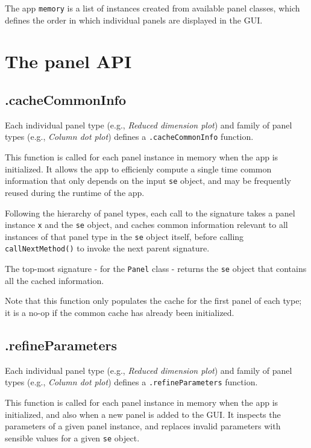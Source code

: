 \documentclass[]{book}
\begin{document}
The app \texttt{memory} is a list of instances created from available panel classes, which defines the order in which individual panels are displayed in the GUI.

\hypertarget{panel-api}{%
\section{The panel API}\label{panel-api}}

\hypertarget{cachecommoninfo}{%
\subsection{.cacheCommonInfo}\label{cachecommoninfo}}

Each individual panel type (e.g., \emph{Reduced dimension plot}) and family of panel types (e.g., \emph{Column dot plot}) defines a \texttt{.cacheCommonInfo} function.

This function is called for each panel instance in memory when the app is initialized.
It allows the app to efficienly compute a single time common information that only depends on the input \texttt{se} object, and may be frequently reused during the runtime of the app.

Following the hierarchy of panel types, each call to the signature takes a panel instance \texttt{x} and the \texttt{se} object, and caches common information relevant to all instances of that panel type in the \texttt{se} object itself, before calling \texttt{callNextMethod()} to invoke the next parent signature.

The top-most signature - for the \texttt{Panel} class - returns the \texttt{se} object that contains all the cached information.

Note that this function only populates the cache for the first panel of each type; it is a no-op if the common cache has already been initialized.

\hypertarget{refineparameters}{%
\subsection{.refineParameters}\label{refineparameters}}

Each individual panel type (e.g., \emph{Reduced dimension plot}) and family of panel types (e.g., \emph{Column dot plot}) defines a \texttt{.refineParameters} function.

This function is called for each panel instance in memory when the app is initialized, and also when a new panel is added to the GUI.
It inspects the parameters of a given panel instance, and replaces invalid parameters with sensible values for a given \texttt{se} object.
\end{document}
